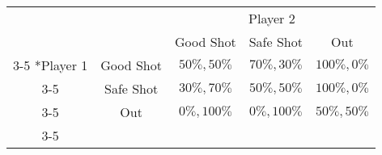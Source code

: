 
\setlength{\extrarowheight}{3pt}

\begin{tabular}{cc|c|c|c|}
                            & \multicolumn{1}{c}{} & \multicolumn{3}{c}{Player 2}                                                            \\
                            & \multicolumn{1}{c}{} & \multicolumn{1}{c}{Good Shot}     & \multicolumn{1}{c}{Safe Shot} & \multicolumn{1}{c}{Out} \\ \cline{3-5}
    \multirow{3}*{Player 1} & Good Shot                 & $50\%, 50\%$                       & $70\%, 30\%$                   & $100\%, 0\%$                      \\ \cline{3-5}
                            & Safe Shot                 & $30\%, 70\%$                     & $50\%, 50\%$                     & $100\%, 0\%$                       \\ \cline{3-5}
                            & Out                       & $0\%, 100\%$                      & $0\%, 100\%$                     & $50\%, 50\%$                       \\ \cline{3-5}
\end{tabular}

\setlength{\extrarowheight}{0pt}